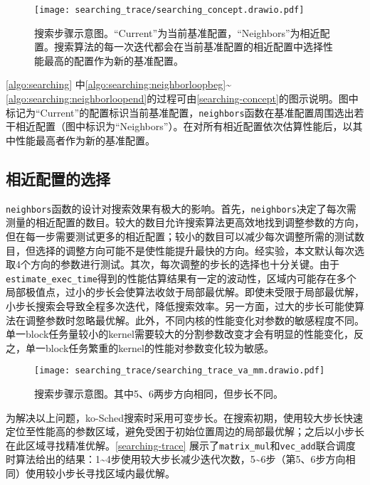 \begin{figure}[htbp]
    \centering
    \texttt{[image: searching\_trace/searching\_concept.drawio.pdf]}
    \caption{搜索步骤示意图。“Current”为当前基准配置，“Neighbors”为相近配置。搜索算法的每一次迭代都会在当前基准配置的相近配置中选择性能最高的配置作为新的基准配置。}
    \label{searching-concept}
\end{figure}

\autoref{algo:searching} 中\autoref{algo:searching:neighborloopbeg}\textasciitilde\autoref{algo:searching:neighborloopend}的过程可由\autoref{searching-concept}的图示说明。图中标记为“Current”的配置标识当前基准配置，\texttt{neighbors}函数在基准配置周围选出若干相近配置（图中标识为“Neighbors”）。在对所有相近配置依次估算性能后，以其中性能最高者作为新的基准配置。

\subsection{相近配置的选择}

\texttt{neighbors}函数的设计对搜索效果有极大的影响。首先，\texttt{neighbors}决定了每次需测量的相近配置的数目。较大的数目允许搜索算法更高效地找到调整参数的方向，但在每一步需要测试更多的相近配置；较小的数目可以减少每次调整所需的测试数目，但选择的调整方向可能不是使性能提升最快的方向。经实验，本文默认每次选取4个方向的参数进行测试。其次，每次调整的步长的选择也十分关键。由于\texttt{estimate\_exec\_time}得到的性能估算结果有一定的波动性，区域内可能存在多个局部极值点，过小的步长会使算法收敛于局部最优解。即使未受限于局部最优解，小步长搜索会导致全程多次迭代，降低搜索效率。另一方面，过大的步长可能使算法在调整参数时忽略最优解。此外，不同内核的性能变化对参数的敏感程度不同。单一block任务量较小的kernel需要较大的分割参数改变才会有明显的性能变化，反之，单一block任务繁重的kernel的性能对参数变化较为敏感。

\begin{figure}[htbp]
    \centering
    \texttt{[image: searching\_trace/searching\_trace\_va\_mm.drawio.pdf]}
    \caption{搜索步骤示意图。其中5、6两步方向相同，但步长不同。}
    \label{searching-trace}
\end{figure}

为解决以上问题，ko-Sched搜索时采用可变步长。在搜索初期，使用较大步长快速定位至性能高的参数区域，避免受困于初始位置周边的局部最优解；之后以小步长在此区域寻找精准优解。\autoref{searching-trace} 展示了\texttt{matrix\_mul}和\texttt{vec\_add}联合调度时算法给出的结果：1\textasciitilde4步使用较大步长减少迭代次数，5\textasciitilde6步（第5、6步方向相同）使用较小步长寻找区域内最优解。

